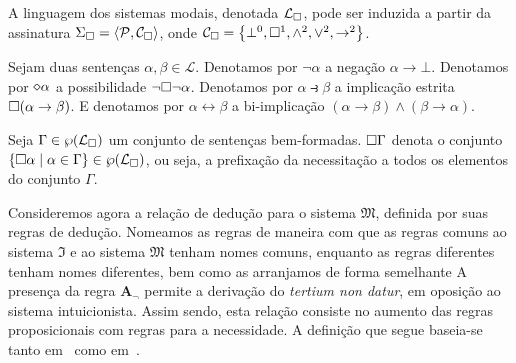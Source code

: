     \vspace{\baselineskip}
    \begin{tcolorbox}[enhanced jigsaw, breakable, sharp corners, colframe=black, colback=white, boxrule=0.5pt, left=1.5mm, right=1.5mm, top=1.5mm, bottom=1.5mm]
    \begin{definition}\label{modal.language}
        A linguagem dos sistemas modais, denotada $\mathcal{L}_{\Box}$, pode ser induzida a partir da assinatura $\Sigma_{\Box}=\langle\mathcal{P},\mathcal{C}_{\Box}\rangle$, onde $\mathcal{C}_{\Box}=\left\{\bot^0,\Box^1,\wedge^2,\vee^2,\to^2\right\}$.
    \end{definition}
    \end{tcolorbox}

    \begin{tcolorbox}[enhanced jigsaw, breakable, sharp corners, colframe=black, colback=white, boxrule=0.5pt, left=1.5mm, right=1.5mm, top=1.5mm, bottom=1.5mm]
    \begin{notation}
        Sejam duas sentenças $\alpha,\beta\in\mathcal{L}$.
        Denotamos por $\neg\alpha$ a negação $\alpha\to\bot$.
        Denotamos por $\pos\alpha$ a possibilidade $\neg\Box\neg\alpha$.
        Denotamos por $\alpha\strictif\beta$ a implicação estrita $\Box(\alpha\to\beta)$.
        E denotamos por $\alpha\leftrightarrow\beta$ a bi-implicação $(\alpha\to\beta)\wedge(\beta\to\alpha)$.
    \end{notation}
    \end{tcolorbox}

    \begin{tcolorbox}[enhanced jigsaw, breakable, sharp corners, colframe=black, colback=white, boxrule=0.5pt, left=1.5mm, right=1.5mm, top=1.5mm, bottom=1.5mm]
    \begin{notation}
        Seja $\Gamma\in\wp(\mathcal{L}_{\Box})$ um conjunto de sentenças bem-formadas.
        $\Box\Gamma$ denota o conjunto $\left\{\Box\alpha\mid\alpha\in\Gamma\right\}\in\wp(\mathcal{L}_{\Box})$, ou seja, a prefixação da necessitação a todos os elementos do conjunto $\Gamma$.
    \end{notation}
    \end{tcolorbox}

\vspace{.5\baselineskip}
    Consideremos agora a relação de dedução para o sistema $\mathfrak{M}$, definida por suas regras de dedução.
    Nomeamos as regras de maneira com que as regras comuns ao sistema $\mathfrak{I}$ e ao sistema $\mathfrak{M}$ tenham nomes comuns, enquanto as regras diferentes tenham nomes diferentes, bem como as arranjamos de forma semelhante
    A presença da regra $\mathbf{A_\neg}$ permite a derivação do \emph{tertium non datur}, em oposição ao sistema intuicionista.
    Assim sendo, esta relação consiste no aumento das regras proposicionais com regras para a necessidade.
    A definição que segue baseia-se tanto em~\cite{Troelstra} como em~\cite{Hakli}.

